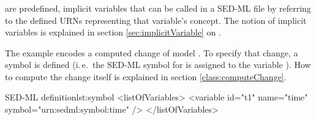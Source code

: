 \subsubsection{}
\label{sec:symbol}

 are predefined, implicit variables that can be called in a SED-ML file by referring to the defined URNs representing that variable's concept. The notion of implicit variables is explained in section \ref{sec:implicitVariable} on .

The example encodes a computed change of model . To specify that change, a symbol is defined (i.\,e.\  the SED-ML symbol for  is assigned to the variable ). How to compute the change itself is explained in section \ref{class:computeChange}.
%
\begin{myXmlLst}{SED-ML  definition}{lst:symbol}
   <listOfVariables>
    <variable id="t1" name="time" symbol="urn:sedml:symbol:time" />
   </listOfVariables>
\end{myXmlLst}